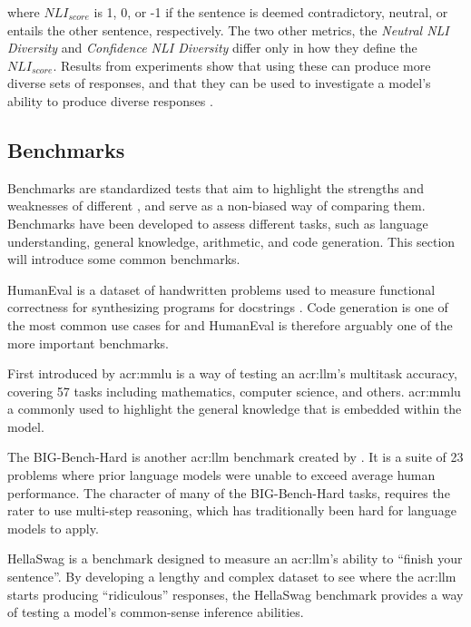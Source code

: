 where $NLI_{score}$ is 1, 0, or -1 if the sentence is deemed contradictory, neutral, or entails the other sentence, respectively. The two other metrics, the \textit{Neutral NLI Diversity} and \textit{Confidence NLI Diversity} differ only in how they define the $NLI_{score}$. Results from experiments show that using these can produce more diverse sets of responses, and that they can be used to investigate a model's ability to produce diverse responses \citep[9]{stasaskiSemanticDiversityDialogue2022}.

\subsection{Benchmarks}\label{subsec:benchmarks}

Benchmarks are standardized tests that aim to highlight the strengths and weaknesses of different , and serve as a non-biased way of comparing them. Benchmarks have been developed to assess different tasks, such as language understanding, general knowledge, arithmetic, and code generation. This section will introduce some common benchmarks.

HumanEval is a dataset of handwritten problems used to measure functional correctness for synthesizing programs for docstrings \citep[2-4]{chenEvaluatingLargeLanguage2021}. Code generation is one of the most common use cases for  and HumanEval is therefore arguably one of the more important benchmarks.

First introduced by \cite{hendrycksMeasuringMassiveMultitask2021} \gls{acr:mmlu} is a way of testing an \acrlong{acr:llm}'s multitask accuracy, covering 57 tasks including mathematics, computer science, and others. \gls{acr:mmlu} a commonly used to highlight the general knowledge that is embedded within the model.

The BIG-Bench-Hard is another \acrshort{acr:llm} benchmark created by \cite{suzgunChallengingBIGBenchTasks2022}. It is a suite of 23 problems where prior language models were unable to exceed average human performance. The character of many of the BIG-Bench-Hard tasks, requires the rater to use multi-step reasoning, which has traditionally been hard for language models to apply.

HellaSwag \citep{zellersHellaSwagCanMachine2019} is a benchmark designed to measure an \acrshort{acr:llm}'s ability to \enquote{finish your sentence}. By developing a lengthy and complex dataset to see where the \acrshort{acr:llm} starts producing \enquote{ridiculous} responses, the HellaSwag benchmark provides a way of testing a model's common-sense inference abilities.





